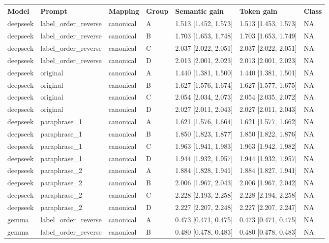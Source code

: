 \begin{tabular}{lllllll}
\toprule
Model & Prompt & Mapping & Group & Semantic gain & Token gain & Class \\
\midrule
deepseek & label\_order\_reverse & canonical & A & 1.513 [1.452, 1.573] & 1.513 [1.453, 1.573] & NA \\
deepseek & label\_order\_reverse & canonical & B & 1.703 [1.653, 1.748] & 1.703 [1.653, 1.749] & NA \\
deepseek & label\_order\_reverse & canonical & C & 2.037 [2.022, 2.051] & 2.037 [2.022, 2.051] & NA \\
deepseek & label\_order\_reverse & canonical & D & 2.013 [2.001, 2.023] & 2.013 [2.001, 2.023] & NA \\
deepseek & original & canonical & A & 1.440 [1.381, 1.500] & 1.440 [1.381, 1.501] & NA \\
deepseek & original & canonical & B & 1.627 [1.576, 1.674] & 1.627 [1.577, 1.675] & NA \\
deepseek & original & canonical & C & 2.054 [2.034, 2.073] & 2.054 [2.035, 2.072] & NA \\
deepseek & original & canonical & D & 2.027 [2.011, 2.043] & 2.027 [2.011, 2.043] & NA \\
deepseek & paraphrase\_1 & canonical & A & 1.621 [1.576, 1.664] & 1.621 [1.577, 1.662] & NA \\
deepseek & paraphrase\_1 & canonical & B & 1.850 [1.823, 1.877] & 1.850 [1.822, 1.876] & NA \\
deepseek & paraphrase\_1 & canonical & C & 1.963 [1.941, 1.983] & 1.963 [1.942, 1.982] & NA \\
deepseek & paraphrase\_1 & canonical & D & 1.944 [1.932, 1.957] & 1.944 [1.932, 1.957] & NA \\
deepseek & paraphrase\_2 & canonical & A & 1.884 [1.828, 1.941] & 1.884 [1.827, 1.941] & NA \\
deepseek & paraphrase\_2 & canonical & B & 2.006 [1.967, 2.043] & 2.006 [1.967, 2.042] & NA \\
deepseek & paraphrase\_2 & canonical & C & 2.228 [2.193, 2.258] & 2.228 [2.194, 2.258] & NA \\
deepseek & paraphrase\_2 & canonical & D & 2.227 [2.207, 2.248] & 2.227 [2.207, 2.247] & NA \\
gemma & label\_order\_reverse & canonical & A & 0.473 [0.471, 0.475] & 0.473 [0.471, 0.475] & NA \\
gemma & label\_order\_reverse & canonical & B & 0.480 [0.478, 0.483] & 0.480 [0.478, 0.483] & NA \\

\end{tabular}

